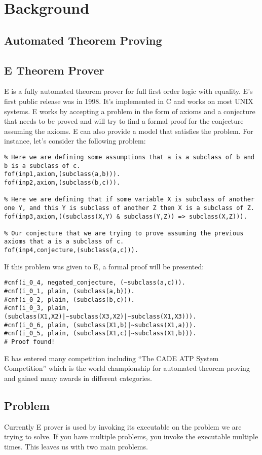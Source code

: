 \chapter{Background}\label{chap:background}

\section{Automated Theorem Proving}
\section{E Theorem Prover}
E is a fully automated theorem prover for full first order logic with equality. E's first public release was in 1998. It's implemented in C and works on most UNIX systems. E works by accepting a problem in the form of axioms and a conjecture that needs to be proved and will try to find a formal proof for the conjecture assuming the axioms. E can also provide a model that satisfies the problem. For instance, let's consider the following problem:
\begin{lstlisting}
% Here we are defining some assumptions that a is a subclass of b and b is a subclass of c.
fof(inp1,axiom,(subclass(a,b))).
fof(inp2,axiom,(subclass(b,c))).

% Here we are defining that if some variable X is subclass of another one Y, and this Y is subclass of another Z then X is a subclass of Z.
fof(inp3,axiom,((subclass(X,Y) & subclass(Y,Z)) => subclass(X,Z))).

% Our conjecture that we are trying to prove assuming the previous axioms that a is a subclass of c.
fof(inp4,conjecture,(subclass(a,c))).
\end{lstlisting}
If this problem was given to E, a formal proof will be presented:
\begin{lstlisting}
#cnf(i_0_4, negated_conjecture, (~subclass(a,c))).
#cnf(i_0_1, plain, (subclass(a,b))).
#cnf(i_0_2, plain, (subclass(b,c))).
#cnf(i_0_3, plain, (subclass(X1,X2)|~subclass(X3,X2)|~subclass(X1,X3))).
#cnf(i_0_6, plain, (subclass(X1,b)|~subclass(X1,a))).
#cnf(i_0_5, plain, (subclass(X1,c)|~subclass(X1,b))).
# Proof found!
\end{lstlisting}
E has entered many competition including ``The CADE ATP System Competition'' which is the world championship for automated theorem proving and gained many awards in different categories.

\section{Problem}
Currently E prover is used by invoking its executable on the problem we are trying to solve. If you have multiple problems, you invoke the executable multiple times. This leaves us with two main problems.

